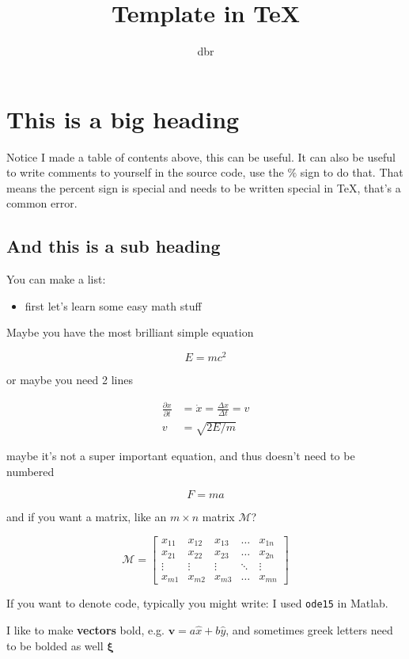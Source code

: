 \documentclass[11pt]{article}
\title{Template in TeX}
\author{dbr}
\newcommand{\beq}{\begin{equation}}
\newcommand{\eeq}{\end{equation}}
\newcommand{\beqa}{\begin{equation}\begin{aligned}}
\newcommand{\eeqa}{\end{aligned}\end{equation}}
\newcommand{\Dt}{\Delta t}
\begin{document}
\maketitle
\tableofcontents

\section{This is a big heading}

Notice I made a table of contents above, this can be useful. 
It can also be useful to write comments to yourself in the source code, use the $\%$ sign to do that. 
That means the percent sign is special and needs to be written special in TeX, that's a common error.

\subsection{And this is a sub heading}

You can make a list:

\begin{itemize}
\item first let's learn some easy math stuff
\end{itemize}


Maybe you have the most brilliant simple equation

\beq
E=mc^2
\eeq

or maybe you need 2 lines

\beqa
\frac{\partial x}{\partial t}&=\dot{x}=\frac{\Delta x}{\Dt} = v\\
v&=\sqrt{2E/m}
\eeqa

maybe it's not a super important equation, and thus doesn't need to be numbered

\[ F=ma \]

and if you want a matrix, like an $m\times n $ matrix $\mathcal{M}$?

\[
\mathcal{M} = \begin{bmatrix}
    x_{11} & x_{12} & x_{13} & \dots  & x_{1n} \\
    x_{21} & x_{22} & x_{23} & \dots  & x_{2n} \\
    \vdots & \vdots & \vdots & \ddots & \vdots \\
    x_{m1} & x_{m2} & x_{m3} & \dots  & x_{mn}
\end{bmatrix}
\]

If you want to denote code, typically you might write: I used \texttt{ode15} in Matlab.

I like to make {\bf vectors} bold, e.g. $\mathbf{v}=a\hat{x}+b\hat{y}$, and sometimes greek letters need to be bolded as well $\boldsymbol{\xi}$
\end{document}

